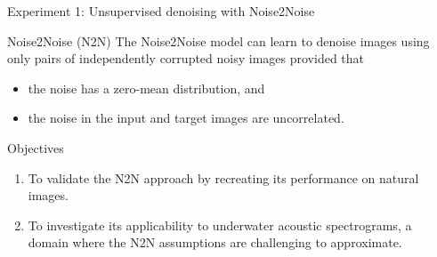 \documentclass[]{beamer}
\begin{document}
        
    

\begin{frame}{Experiment 1: Unsupervised denoising with Noise2Noise}
    

    \begin{exampleblock}{Noise2Noise (N2N)}
        The Noise2Noise model can learn to denoise images using only pairs of independently corrupted noisy images provided that 
        \begin{itemize}
            \item the noise has a zero-mean distribution, and
            \item the noise in the input and target images are uncorrelated.
        \end{itemize}
    \end{exampleblock}
    
    \begin{alertblock}{Objectives}
        \begin{enumerate}
            \item To validate the N2N approach by recreating its performance on natural images.
            \item To investigate its applicability to underwater acoustic spectrograms, a domain where the N2N assumptions are challenging to approximate.
        \end{enumerate}
    \end{alertblock}
\end{frame}
\end{document}

